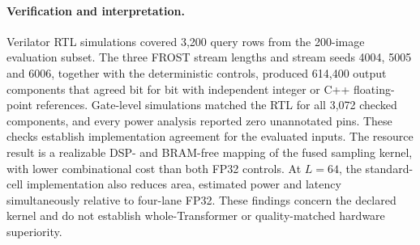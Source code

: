 \paragraph{Verification and interpretation.}
Verilator RTL simulations covered 3,200 query rows from the 200-image
evaluation subset. The three FROST stream lengths and stream seeds
4004, 5005 and 6006, together with the deterministic controls, produced
614,400 output components that agreed bit for bit with independent
integer or C++ floating-point references. Gate-level simulations matched
the RTL for all 3,072 checked components, and every power analysis
reported zero unannotated pins.
These checks establish implementation agreement for the evaluated inputs.
The resource result is a realizable DSP- and BRAM-free mapping of the
fused sampling kernel, with lower combinational cost than both FP32
controls. At $L=64$, the standard-cell implementation also reduces area,
estimated power and latency simultaneously relative to four-lane FP32.
These findings concern
the declared kernel and do not establish whole-Transformer or
quality-matched hardware superiority.
